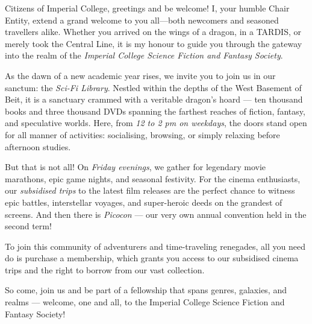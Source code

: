 Citizens of Imperial College, greetings and be welcome! I, your humble Chair Entity, extend a grand welcome to you all—both newcomers and seasoned travellers alike. Whether you arrived on the wings of a dragon, in a TARDIS, or merely took the Central Line, it is my honour to guide you through the gateway into the realm of the \textit{Imperial College Science Fiction and Fantasy Society}.

As the dawn of a new academic year rises, we invite you to join us in our sanctum: the \textit{Sci-Fi Library}. Nestled within the depths of the West Basement of Beit, it is a sanctuary crammed with a veritable dragon’s hoard — ten thousand books and three thousand DVDs spanning the farthest reaches of fiction, fantasy, and speculative worlds. Here, from \textit{12 to 2 pm on weekdays}, the doors stand open for all manner of activities: socialising, browsing, or simply relaxing before afternoon studies.

But that is not all! On \textit{Friday evenings}, we gather for legendary movie marathons, epic game nights, and seasonal festivity. For the cinema enthusiasts, our \textit{subsidised trips} to the latest film releases are the perfect chance to witness epic battles, interstellar voyages, and super-heroic deeds on the grandest of screens. And then there is \textit{Picocon} — our very own annual convention held in the second term!

To join this community of adventurers and time-traveling renegades, all you need do is purchase a membership, which grants you access to our subsidised cinema trips and the right to borrow from our vast collection.

So come, join us and be part of a fellowship that spans genres, galaxies, and realms — welcome, one and all, to the Imperial College Science Fiction and Fantasy Society!
